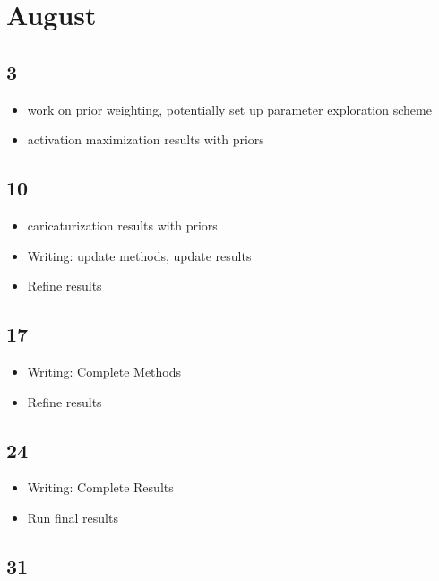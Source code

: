 \documentclass{article}
\begin{document}
\section*{August}

\subsection*{3}

\begin{itemize}
	\item work on prior weighting, potentially set up parameter exploration scheme
	\item activation maximization results with priors
\end{itemize}


\subsection*{10}

\begin{itemize}
	\item caricaturization results with priors
	\item Writing: update methods, update results
	\item Refine results
\end{itemize}

\subsection*{17}

\begin{itemize}
	\item Writing: Complete Methods
	\item Refine results
\end{itemize}

\subsection*{24}

\begin{itemize}
	\item Writing: Complete Results
	\item Run final results
\end{itemize}

\subsection*{31}
\end{document}
